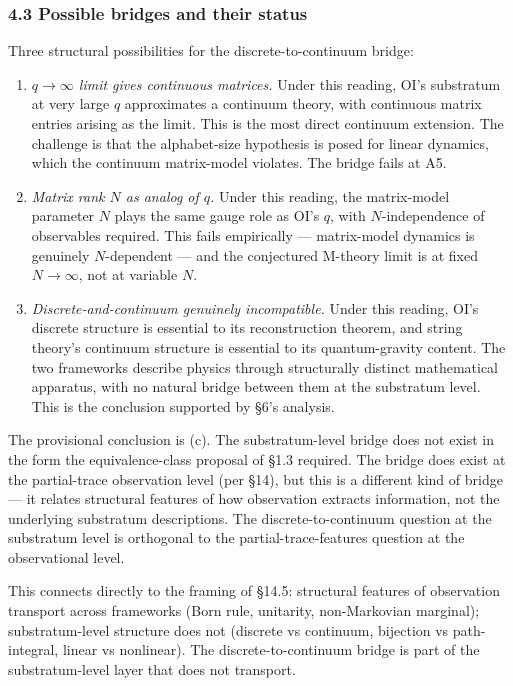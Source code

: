 \documentclass[
]{article}
\begin{document}
\hypertarget{possible-bridges-and-their-status}{%
\subsubsection{4.3 Possible bridges and their
status}\label{possible-bridges-and-their-status}}

Three structural possibilities for the discrete-to-continuum bridge:

\begin{enumerate}
\def\labelenumi{(\alph{enumi})}
\item
  \emph{\(q \to \infty\) limit gives continuous matrices.} Under this
  reading, OI's substratum at very large \(q\) approximates a continuum
  theory, with continuous matrix entries arising as the limit. This is
  the most direct continuum extension. The challenge is that the
  alphabet-size hypothesis is posed for linear dynamics, which the
  continuum matrix-model violates. The bridge fails at A5.
\item
  \emph{Matrix rank \(N\) as analog of \(q\).} Under this reading, the
  matrix-model parameter \(N\) plays the same gauge role as OI's \(q\),
  with \(N\)-independence of observables required. This fails
  empirically --- matrix-model dynamics is genuinely \(N\)-dependent ---
  and the conjectured M-theory limit is at fixed \(N \to \infty\), not
  at variable \(N\).
\item
  \emph{Discrete-and-continuum genuinely incompatible.} Under this
  reading, OI's discrete structure is essential to its reconstruction
  theorem, and string theory's continuum structure is essential to its
  quantum-gravity content. The two frameworks describe physics through
  structurally distinct mathematical apparatus, with no natural bridge
  between them at the substratum level. This is the conclusion supported
  by §6's analysis.
\end{enumerate}

The provisional conclusion is (c). The substratum-level bridge does not
exist in the form the equivalence-class proposal of §1.3 required. The
bridge does exist at the partial-trace observation level (per §14), but
this is a different kind of bridge --- it relates structural features of
how observation extracts information, not the underlying substratum
descriptions. The discrete-to-continuum question at the substratum level
is orthogonal to the partial-trace-features question at the
observational level.

This connects directly to the framing of §14.5: structural features of
observation transport across frameworks (Born rule, unitarity,
non-Markovian marginal); substratum-level structure does not (discrete
vs continuum, bijection vs path-integral, linear vs nonlinear). The
discrete-to-continuum bridge is part of the substratum-level layer that
does not transport.
\end{document}
